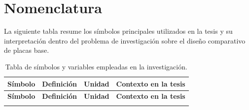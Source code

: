 \chapter*{Nomenclatura}

\noindent La siguiente tabla resume los símbolos principales utilizados en la tesis y su
interpretación dentro del problema de investigación sobre el diseño comparativo de placas base.

\small
\begin{longtable}{p{} p{} p{} p{}}
\caption{Tabla de símbolos y variables empleadas en la investigación.}
\label{tab:nomenclatura}\\
\toprule
\textbf{Símbolo} & \textbf{Definición} & \textbf{Unidad} & \textbf{Contexto en la tesis} \\
\midrule
\endfirsthead

\toprule
\textbf{Símbolo} & \textbf{Definición} & \textbf{Unidad} & \textbf{Contexto en la tesis} \\
\midrule
\endhead

\bottomrule
\endfoot


\end{longtable}
